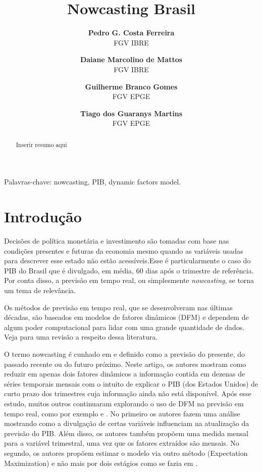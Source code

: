 \documentclass{article}
\title{\textbf{Nowcasting Brasil}}
\author{
\textbf{Pedro G. Costa Ferreira} \\
\small{FGV IBRE}
\and
\textbf{Daiane Marcolino de Mattos}\\
\small{FGV IBRE}
\and
\textbf{Guilherme Branco Gomes}\\
\small{FGV EPGE}
\and
\textbf{Tiago dos Guaranys Martins}\\
\small{FGV EPGE}
}
\date{}
\begin{document}


\maketitle %

\begin{abstract}
Inserir resumo aqui
\end{abstract}

Palavras-chave: nowcasting, PIB, dynamic factors model.

{\let\thefootnote\relax{}}


\section{Introdução}\label{intro}

Decisões de política monetária e investimento são tomadas com base nas condições presentes e futuras da economia mesmo quando as variáveis usadas para descrever esse estado não estão acessíveis.Esse é particularmente o caso do PIB do Brasil que é divulgado, em média, 60 dias após o trimestre de referência. Por conta disso, a previsão em tempo real, ou simplesmente \textit{nowcasting}, se torna um tema de relevância.

Os métodos de previsão em tempo real, que se desenvolveram nas últimas décadas, são baseados em modelos de fatores dinâmicos (DFM) e dependem de algum poder computacional para lidar com uma grande quantidade de dados. Veja \cite{stockwatson2006} para uma revisão a respeito dessa literatura.

O termo nowcasting é cunhado em \cite{giannoneetal2008} e definido como a previsão do presente, do passado recente ou do futuro próximo. Neste artigo, os autores mostram como reduzir em apenas dois fatores dinâmicos a informação contida em dezenas de séries temporais mensais com o intuito de explicar o PIB (dos Estados Unidos) de curto prazo dos trimestres cuja informação ainda não está disponível. Após esse estudo, muitos outros continuaram explorando o uso de DFM na previsão em tempo real, como por exemplo \cite{banburarunstler2011} e \cite{banburaetal2011}. No primeiro os autores fazem uma análise mostrando como a divulgação de certas variáveis influenciam na atualização da previsão do PIB. Além disso, os autores também propõem uma medida mensal para a variável trimestral, uma vez que os fatores extraídos são mensais. No segundo, os autores propõem estimar o modelo via outro método (Expectation Maximization) e não mais por dois estágios como se fazia em \cite{giannoneetal2008}.
\end{document}
